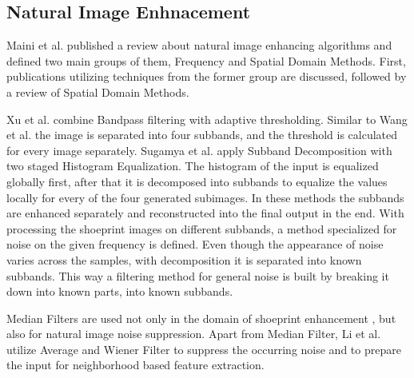 \documentclass[draft,final]{vutinfth} %
\begin{document}


\subsection{Natural Image Enhnacement}
\par
Maini et al. \cite{maini2010comprehensive} published a review about natural image enhancing algorithms and defined two main groups of them, Frequency and Spatial Domain Methods.
First, publications utilizing techniques from the former group are discussed, followed by a review of Spatial Domain Methods. 
\par
Xu et al. \cite{xu2016image} combine Bandpass filtering with adaptive thresholding.
Similar to Wang et al. \cite{wang2014enhanced} the image is separated into four subbands, and the threshold is calculated for every image separately.
Sugamya et al. \cite{sugamya2016image} apply Subband Decomposition with two staged Histogram Equalization.
The histogram of the input is equalized globally first, after that it is decomposed into subbands to equalize the values locally for every of the four generated subimages.
In these methods the subbands are enhanced separately and reconstructed into the final output in the end.
With processing the shoeprint images on different subbands, a method specialized for noise on the given frequency is defined.
Even though the appearance of noise varies across the samples, with decomposition it is separated into known subbands.
This way a filtering method for general noise is built by breaking it down into known parts, into known subbands.  
\par
Median Filters are used not only in the domain of shoeprint enhancement \cite{alizadeh2017automatic}, but also for natural image noise suppression.
Apart from Median Filter, Li et al. \cite{li2014rapid} utilize Average and Wiener Filter to suppress the occurring noise and to prepare the input for neighborhood based feature extraction.
\end{document}
